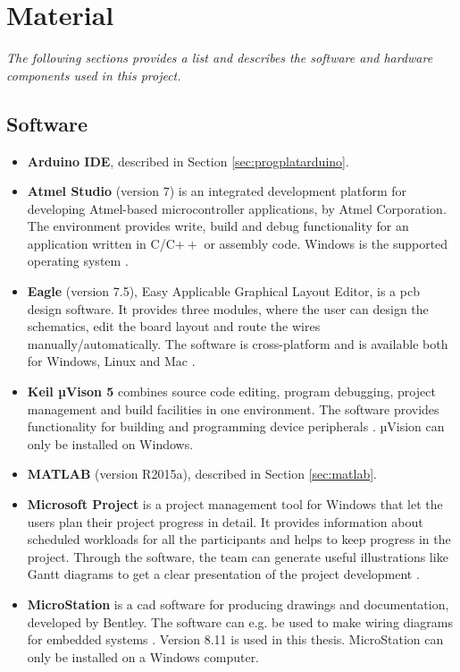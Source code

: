 \chapter{Material}
\textit{The following sections provides a list and describes the software and hardware components used in this project.}
\section{Software}
\label{sec:software}
\begin{itemize}
    \item \textbf{Arduino IDE}, described in Section \ref{sec:progplatarduino}.
    \item \textbf{Atmel Studio} (version 7) is an integrated development platform for developing Atmel-based microcontroller applications, by Atmel Corporation. The environment provides write, build and debug functionality for an application written in C/C$++$ or assembly code. Windows is the supported operating system \cite{atmel}. 
    \item \textbf{Eagle} (version 7.5), Easy Applicable Graphical Layout Editor, is a \acrfull{pcb} design software. It provides three modules, where the user can design the schematics, edit the board layout and route the wires manually/automatically. The software is cross-platform and is available both for Windows, Linux and Mac \cite{eagle}.
    \item \textbf{Keil µVison 5} combines source code editing, program debugging, project management and build facilities in one environment. The software provides functionality for building and programming device peripherals \cite{uvision}. µVision can only be installed on Windows.
    \item \textbf{MATLAB} (version R2015a), described in Section \ref{sec:matlab}.
    \item \textbf{Microsoft Project} is a project management tool for Windows that let the users plan their project progress in detail. It provides information about scheduled workloads for all the participants and helps to keep progress in the project. Through the software, the team can generate useful illustrations like Gantt diagrams to get a clear presentation of the project development \cite{msproject}. 
    \item \textbf{MicroStation} is a \acrfull{cad} software for producing drawings and documentation, developed by Bentley. The software can e.g. be used to make wiring diagrams for embedded systems \cite{microstation}. Version 8.11 is used in this thesis. MicroStation can only be installed on a Windows computer.

\end{itemize}
